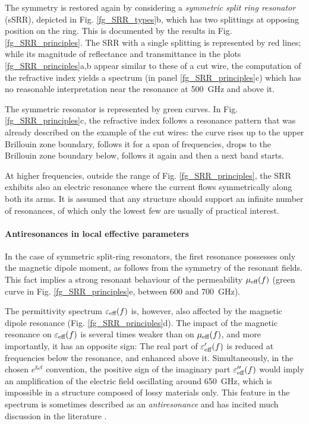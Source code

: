 The symmetry is restored again by considering a \textit{symmetric split ring resonator} (sSRR), depicted in Fig. \ref{fg_SRR_types}b, which has two splittings at opposing position on the ring.  
This is documented by the results in Fig. \ref{fg_SRR_principles}. The SRR with a single splitting is represented by red lines; while its magnitude of reflectance and transmittance in the plots \ref{fg_SRR_principles}a,b appear similar to these of a cut wire, the computation of the refractive index yields a spectrum (in panel \ref{fg_SRR_principles}c) which has no reasonable interpretation near the resonance at 500~GHz and above it. 

The symmetric resonator is represented by green curves. In Fig. \ref{fg_SRR_principles}c, the refractive index follows a resonance pattern that was already described on the example of the cut wires: the curve rises up to the upper Brillouin zone boundary, follows it for a span of frequencies, drops to the Brillouin zone boundary below, follows it again and then a next band starts. 

At higher frequencies, outside the range of Fig. \ref{fg_SRR_principles}, the SRR exhibits also an electric resonance where the current flows symmetrically along both its arms. It is assumed that any structure should support an infinite number of resonances, of which only the lowest few are usually of practical interest.
\paragraph{Antiresonances in local effective parameters}%
In the case of symmetric split-ring resonators, the first resonance possesses only the magnetic dipole moment, as follows from the symmetry of the resonant fields. This fact implies a strong resonant behaviour of the permeability $\mu_{\text{eff} }(f)$ (green curve in Fig. \ref{fg_SRR_principles}e, between 600 and 700~GHz). 

The permittivity spectrum $\varepsilon_{\text{eff} }(f)$ is, however, also affected by the magnetic dipole resonance  (Fig. \ref{fg_SRR_principles}d). The impact of the magnetic resonance on $\varepsilon_{\text{eff} }(f)$ is several times weaker than on $\mu_{\text{eff} }(f)$, and more importantly, it has an opposite sign: The real part of $\varepsilon_{\text{eff} }'(f)$ is reduced at frequencies below the resonance, and enhanced above it. Simultaneously, in the chosen $e^{\ii\omega t}$ convention, the positive sign of the imaginary part $\varepsilon_{\text{eff} }''(f)$ would imply an amplification of the electric field oscillating around 650~GHz, which is impossible in a structure composed of lossy materials only. This feature in the spectrum is sometimes described as an \textit{antiresonance} and has incited much discussion in the literature \cite{koschny2003resonant, wallen2011anti}. 
